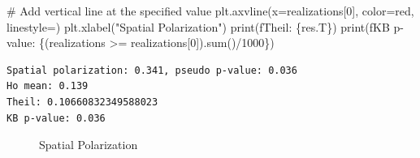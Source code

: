 \documentclass[
  a4paper, 
  twoside,
  final
]{article}
\newenvironment{Shaded}{\begin{snugshade}}{\end{snugshade}}
\newcommand{\BuiltInTok}[1]{\textcolor[rgb]{0.00,0.23,0.31}{#1}}
\newcommand{\CommentTok}[1]{\textcolor[rgb]{0.37,0.37,0.37}{#1}}
\newcommand{\DecValTok}[1]{\textcolor[rgb]{0.68,0.00,0.00}{#1}}
\newcommand{\NormalTok}[1]{\textcolor[rgb]{0.00,0.23,0.31}{#1}}
\newcommand{\OperatorTok}[1]{\textcolor[rgb]{0.37,0.37,0.37}{#1}}
\newcommand{\SpecialCharTok}[1]{\textcolor[rgb]{0.37,0.37,0.37}{#1}}
\newcommand{\SpecialStringTok}[1]{\textcolor[rgb]{0.13,0.47,0.30}{#1}}
\newcommand{\StringTok}[1]{\textcolor[rgb]{0.13,0.47,0.30}{#1}}
\begin{document}
\begin{Shaded}
\begin{Highlighting}[]
\CommentTok{\# Add vertical line at the specified value}
\NormalTok{plt.axvline(x}\OperatorTok{=}\NormalTok{realizations[}\DecValTok{0}\NormalTok{], color}\OperatorTok{=}\StringTok{\textquotesingle{}red\textquotesingle{}}\NormalTok{, linestyle}\OperatorTok{=}\StringTok{\textquotesingle{}{-}{-}\textquotesingle{}}\NormalTok{)}
\NormalTok{plt.xlabel(}\StringTok{"Spatial Polarization"}\NormalTok{)}
\BuiltInTok{print}\NormalTok{(}\SpecialStringTok{f\textquotesingle{}Theil: }\SpecialCharTok{\{}\NormalTok{res}\SpecialCharTok{.}\NormalTok{T}\SpecialCharTok{\}}\SpecialStringTok{\textquotesingle{}}\NormalTok{)}
\BuiltInTok{print}\NormalTok{(}\SpecialStringTok{f\textquotesingle{}KB p{-}value: }\SpecialCharTok{\{}\NormalTok{(realizations }\OperatorTok{\textgreater{}=}\NormalTok{ realizations[}\DecValTok{0}\NormalTok{])}\SpecialCharTok{.}\BuiltInTok{sum}\NormalTok{()}\OperatorTok{/}\DecValTok{1000}\SpecialCharTok{\}}\SpecialStringTok{\textquotesingle{}}\NormalTok{)}
\end{Highlighting}
\end{Shaded}

\begin{verbatim}
Spatial polarization: 0.341, pseudo p-value: 0.036
Ho mean: 0.139
Theil: 0.10660832349588023
KB p-value: 0.036
\end{verbatim}

\begin{figure}[H]


\caption{\label{fig-polarization}Spatial Polarization}

\end{figure}%
\end{document}
